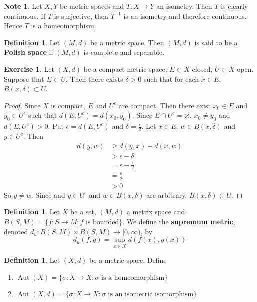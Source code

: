 \documentclass[12pt]{amsart}
\theoremstyle{definition}
\newtheorem{defn}[definition]{Definition}
\newtheorem{note}[definition]{Note}
\newtheorem{ex}[definition]{Exercise}
\newcommand{\del}{\delta}
\newcommand{\ep}{\epsilon}
\newcommand{\sig}{\sigma}
\newcommand{\Rg}{[0,\infty)}
\DeclareMathOperator{\Aut}{Aut}
\newcommand{\lex}[1]{\label{ex:#1}}
\newcommand{\ld}[1]{\label{defn:#1}}
\begin{document}
	\begin{note}
		Let $X,Y$ be metric spaces and $T:X \rightarrow Y$ an isometry. Then $T$ is clearly continuous. If $T$ is surjective, then $T^{-1}$ is an isometry and therefore continuous. Hence $T$ is a homeomorphism.
	\end{note}
	
	\begin{defn} \ld{}
	Let $(M,d)$ be a metric space. Then $(M,d)$ is said to be a \textbf{Polish space} if $(M,d)$ is complete and separable. 
	\end{defn}
	
	
	
	\begin{ex} \lex{}
	Let $(X, d)$ be a compact metric space, $E \subset X$ closed, $U \subset X$ open. Suppose that $E \subset U$. Then there exists $\del >0$ such that for each $x \in E$, $B(x, \del) \subset U$.
	\end{ex}	
	
	\begin{proof}
	Since $X$ is compact, $E$ and $U^c$ are compact. Then there exist $x_0 \in E$ and $y_0 \in U^c$ such that $d(E, U^c) = d(x_0,y_0)$. Since $E \cap U^c = \varnothing$, $x_0 \neq y_0$ and $d(E, U^c) >0$. Put $\ep = d(E, U^c)$ and $\del = \frac{\ep}{2}$.  Let $x \in E$, $w \in B(x, \del)$ and $y \in U^c$. Then 
	\begin{align*}
	d(y, w) 
	&\geq d(y, x) - d(x, w) \\
	&> \ep - \del \\
	&= \ep - \frac{\ep}{2} \\
	&= \frac{\ep}{2} \\
	&> 0
\end{align*}	  
	So $y \neq w$. Since and $y \in U^c$ and $w \in B(x, \del)$ are arbitrary, $B(x, \del) \subset U$.
	\end{proof}
	
	\begin{defn} \ld{}
	Let $X$ be a set, $(M, d)$ a metrix space and $B(S, M) = \{f: S \rightarrow M: f \text{ is bounded} \}$. We define the \textbf{supremum metric}, denoted $d_u:B(S,M) \times B(S,M) \rightarrow \Rg$, by $$d_u(f, g) = \sup_{x \in X}d(f(x), g(x)) $$ 
	\end{defn}
	
	\begin{defn} \ld{}
	Let $(X, d)$ be a metric space. Define
	\begin{enumerate}
	\item $\Aut(X) = \{\sig:X \rightarrow X: \sig \text{ is a homeomorphism}\}$
	\item $\Aut(X, d) = \{\sig:X \rightarrow X: \sig \text{ is an isometric isomorphism}\}$
	\end{enumerate}
	\end{defn}
	
\end{document}
